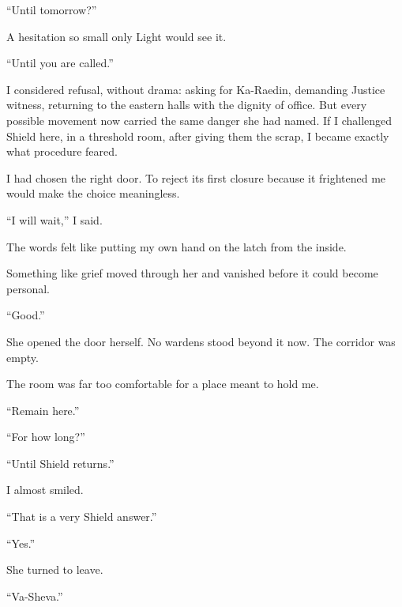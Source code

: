 ``Until tomorrow?''\par

A hesitation so small only Light would see it.\par

``Until you are called.''\par

I considered refusal, without drama: asking for Ka-Raedin, demanding Justice witness, returning to the eastern halls with the dignity of office. But every possible movement now carried the same danger she had named. If I challenged Shield here, in a threshold room, after giving them the scrap, I became exactly what procedure feared.\par

I had chosen the right door. To reject its first closure because it frightened me would make the choice meaningless.\par

``I will wait,'' I said.\par

The words felt like putting my own hand on the latch from the inside.\par

Something like grief moved through her and vanished before it could become personal.\par

``Good.''\par

She opened the door herself. No wardens stood beyond it now. The corridor was empty.\par

The room was far too comfortable for a place meant to hold me.\par

``Remain here.''\par

``For how long?''\par

``Until Shield returns.''\par

I almost smiled.\par

``That is a very Shield answer.''\par

``Yes.''\par

She turned to leave.\par

``Va-Sheva.''\par

